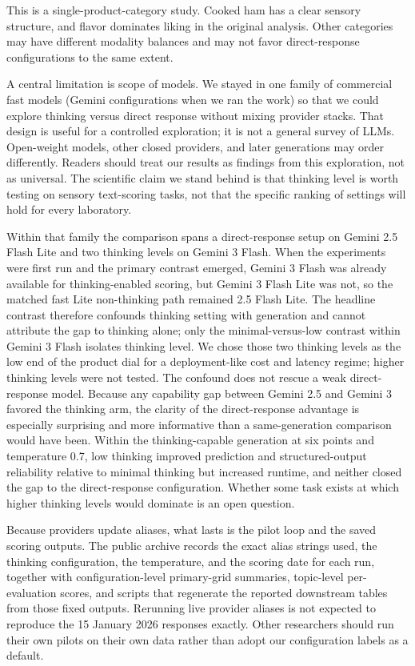 \documentclass[11pt]{article}
\begin{document}
This is a single-product-category study. Cooked ham has a clear sensory
structure, and flavor dominates liking in the original analysis. Other
categories may have different modality balances and may not favor
direct-response configurations to the same extent.

A central limitation is scope of models. We stayed in one family of commercial
fast models (Gemini configurations when we ran the work) so that we could
explore thinking versus direct response without mixing provider stacks. That
design is useful for a controlled exploration; it is not a general survey of
LLMs. Open-weight models, other closed providers, and later generations may
order differently. Readers should treat our results as findings from this
exploration, not as universal. The scientific claim we stand behind is that
thinking level is worth testing on sensory text-scoring tasks, not that the
specific ranking of settings will hold for every laboratory.

Within that family the comparison spans a direct-response setup on Gemini 2.5
Flash Lite and two thinking levels on Gemini 3 Flash. When the experiments
were first run and the primary contrast emerged, Gemini 3 Flash was already
available for thinking-enabled scoring, but Gemini 3 Flash Lite was not, so
the matched fast Lite non-thinking path remained 2.5 Flash Lite. The headline
contrast therefore confounds thinking setting with generation and cannot
attribute the gap to thinking alone; only the minimal-versus-low contrast
within Gemini 3 Flash isolates thinking level. We chose those two thinking
levels as the low end of the product dial for a deployment-like cost and
latency regime; higher thinking levels were not tested. The confound does not
rescue a weak direct-response model. Because any capability gap between Gemini
2.5 and Gemini 3 favored the thinking arm, the clarity of the
direct-response advantage is especially surprising and more informative than
a same-generation comparison would have been. Within the thinking-capable
generation at six points and temperature 0.7, low thinking improved
prediction and structured-output reliability relative to minimal thinking but
increased runtime, and neither closed the gap to the direct-response
configuration. Whether some task exists at which higher thinking levels would
dominate is an open question.

Because providers update aliases, what lasts is the pilot loop and the saved
scoring outputs. The public archive records the exact alias strings used, the
thinking configuration, the temperature, and the scoring date for each run,
together with configuration-level primary-grid summaries, topic-level
per-evaluation scores, and scripts that regenerate the reported downstream
tables from those fixed outputs. Rerunning live provider aliases is not
expected to reproduce the 15 January 2026 responses exactly. Other researchers
should run their own pilots on their own data rather than adopt our
configuration labels as a default.
\end{document}
